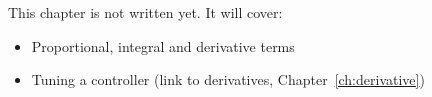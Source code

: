 \label{ch:ctl1}
\begin{keyidea}
This chapter is not written yet. It will cover:
\begin{itemize}[nosep]
  \item Proportional, integral and derivative terms
  \item Tuning a controller (link to derivatives, Chapter~\ref{ch:derivative})
\end{itemize}
\end{keyidea}
